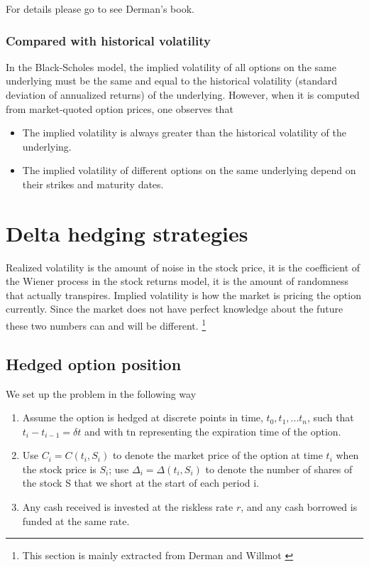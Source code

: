 \documentclass[10pt]{article}
\theoremstyle{plain}
\numberwithin{equation}{section}
\numberwithin{table}{section}
\newcommand{\de}{\delta}
\begin{document}
For details please go to see Derman's book\cite{Derman}.



\subsubsection{Compared with historical volatility}
In the Black-Scholes model, the implied volatility of all options on the same
underlying must be the same and equal to the historical volatility (standard
deviation of annualized returns) of the underlying. However, when it is computed
from market-quoted option prices, one observes that
\begin{itemize}
    \item The implied volatility is always greater than the historical volatility of the
    underlying.
    \item The implied volatility of different options on the same underlying depend
    on their strikes and maturity dates.
\end{itemize}


\newpage 
\section{Delta hedging strategies}
Realized volatility is the amount of noise in the stock price, it is the coefficient
of the Wiener process in the stock returns model, it is the amount of randomness that actually transpires. Implied volatility is how the
market is pricing the option currently. Since the market does not have
perfect knowledge about the future these two numbers can and will be
different. \footnote{This section is mainly extracted from Derman \cite{Derman} and Willmot \cite{Wilmott}}

\subsection{Hedged option position}

We set up the problem in the following way
\begin{enumerate}
    \item Assume the option
    is hedged at discrete points in time, $t_0, t_1,...t_n$, such that $t_i-t_{i-1}=\de t$ and
    with tn representing the expiration time of the option.
    \item Use $C_i = C(t_i, S_i)$ to denote the market price of the option at time $t_i$ when the
    stock price is $S_i$; use $\Delta_i=\Delta(t_i, S_i)$ to denote the number of shares of
    the stock S that we short at the start of each period i.
    \item Any cash received is
    invested at the riskless rate $r$, and any cash borrowed is funded at the same
    rate.
\end{enumerate}
\end{document}
